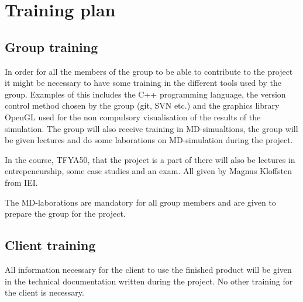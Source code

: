 \section{Training plan}

\subsection{Group training}
In order for all the members of the group to be able to contribute to the
project it might be necessary to have some training in the different tools
used by the group. Examples of this includes the C++ programming language, the
version control method chosen by the group (git, SVN etc.) and the graphics
library OpenGL used for the non compulsory visualisation of the results of the
simulation. The group will also receive training in MD-simualtions, the group
will be given lectures and do some laborations on MD-simulation during the
project.

In the course, TFYA50, that the project is a part of there will also be
lectures in entrepeneurship, some case studies and an exam. All given by
Magnus Kloffsten from IEI.

The MD-laborations are mandatory for all group members and are given to
prepare the group for the project.

\subsection{Client training}
All information necessary for the client to use the finished product will be
given in the technical documentation written during the project. No other
training for the client is necessary.

